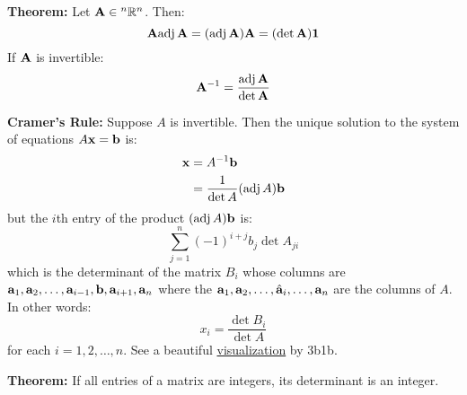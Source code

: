 \documentclass{article}
\begin{document}
\begin{minipage}[t]{0.45\linewidth}
        \textbf{Theorem:} Let $\mathbf{A} \in {^n}\mathbb{R}^n$. Then:
        \begin{equation*}
            \mathbf{A}\mathrm{adj}\,\mathbf{A} = (\mathrm{adj}\,\mathbf{A})\mathbf{A} = (\det \mathbf{A}) \mathbf{1}
        \end{equation*}
        If $\mathbf{A}$ is invertible:
        \begin{equation*}
            \mathbf{A}^{-1} = \frac{\mathrm{adj}\,\mathbf{A}}{\det \mathbf{A}}
        \end{equation*}
    \end{minipage}\hfill
    \begin{minipage}[t]{0.45\linewidth}
        \textbf{Cramer's Rule:} Suppose $A$ is invertible. Then the unique solution to the system of equations $A\mathbf{x}=\mathbf{b}$ is:
        \begin{align*}
            \mathbf{x} &= A^{-1}\mathbf{b} \\ 
            &= \frac{1}{\det A}(\mathrm{adj}\,A) \mathbf{b}
        \end{align*}
        but the $i$th entry of the product $(\mathrm{adj}\,A)\mathbf{b}$ is:
        \begin{equation*}
            \sum_{j=1}^n (-1)^{i+j}b_j \det A_{ji}
        \end{equation*}
        which is the determinant of the matrix $B_i$ whose columns are $\mathbf{a}_1,\mathbf{a}_2,\dots,\mathbf{a}_{i-1},\mathbf{b},\mathbf{a}_{i+1},\mathbf{a}_n$ where the $\mathbf{a}_1,\mathbf{a}_2,\dots,\hat{\mathbf{a}}_i,\dots,\mathbf{a}_n$ are the columns of $A$. In other words:
        \begin{equation*}
            x_i = \frac{\det B_i}{\det A}
        \end{equation*}
        for each $i=1,2,\dots,n$. See a beautiful \href{https://www.youtube.com/watch?v=jBsC34PxzoM}{visualization} by 3b1b.
        \vspace{2mm}

        \textbf{Theorem:} If all entries of a matrix are integers, its determinant is an integer.
    \end{minipage}
\end{document}
